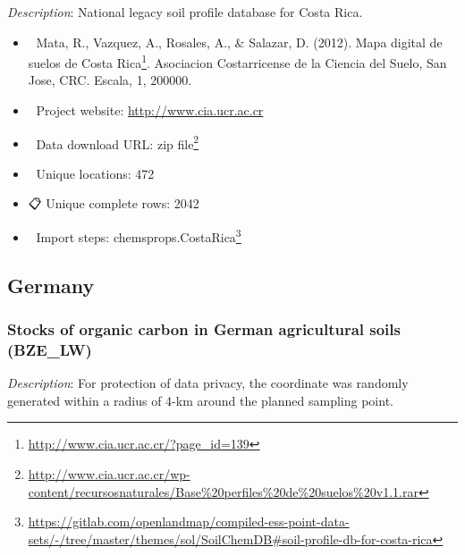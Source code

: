 \documentclass[
  graybox,natbib,nospthms]{svmono}
\providecommand{\tightlist}{%
  \setlength{\itemsep}{0pt}\setlength{\parskip}{0pt}}
\providecommand{\tightlist}{\setlength{\itemsep}{0pt}\setlength{\parskip}{0pt}}
\renewcommand{\href}[2]{#2 (\url{#1})}
\renewcommand{\href}[2]{#2\footnote{\url{#1}}}
\begin{document}
\emph{Description}: National legacy soil profile database for Costa Rica.

\begin{itemize}
\tightlist
\item
  📕 Mata, R., Vazquez, A., Rosales, A., \& Salazar, D. (2012). \href{http://www.cia.ucr.ac.cr/?page_id=139}{Mapa digital de suelos de Costa Rica}. Asociacion Costarricense de la Ciencia del Suelo, San Jose, CRC. Escala, 1, 200000.\\
\item
  🔗 Project website: \url{http://www.cia.ucr.ac.cr}\\
\item
  📂 Data download URL: \href{http://www.cia.ucr.ac.cr/wp-content/recursosnaturales/Base\%20perfiles\%20de\%20suelos\%20v1.1.rar}{zip file}\\
\item
  📍 Unique locations: 472\\
\item
  📋 Unique complete rows: 2042\\
\item
  📝 Import steps: \href{https://gitlab.com/openlandmap/compiled-ess-point-data-sets/-/tree/master/themes/sol/SoilChemDB\#soil-profile-db-for-costa-rica}{chemsprops.CostaRica}
\end{itemize}

\hypertarget{germany}{%
\subsection{Germany}\label{germany}}

\hypertarget{stocks-of-organic-carbon-in-german-agricultural-soils-bze_lw}{%
\subsubsection{Stocks of organic carbon in German agricultural soils (BZE\_LW)}\label{stocks-of-organic-carbon-in-german-agricultural-soils-bze_lw}}

\emph{Description}: For protection of data privacy, the coordinate was randomly generated
within a radius of 4-km around the planned sampling point.
\end{document}
